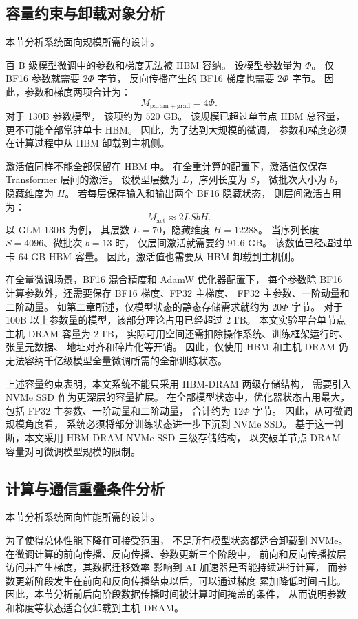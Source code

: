 \documentclass[bachelor,openany,oneside,color,AutoFakeBold=true]{buaathesis}
\begin{document}
\subsection{容量约束与卸载对象分析}

本节分析系统面向规模所需的设计。

百 B 级模型微调中的参数和梯度无法被 HBM 容纳。
设模型参数量为 $\Phi$。
仅 BF16 参数就需要 $2\Phi$ 字节，
反向传播产生的 BF16 梯度也需要 $2\Phi$ 字节。
因此，参数和梯度两项合计为：
\[
M_{\mathrm{param+grad}} = 4\Phi .
\]
对于 130B 参数模型，
该项约为 $520$ GB。
该规模已超过单节点 HBM 总容量，
更不可能全部常驻单卡 HBM。
因此，为了达到大规模的微调，
参数和梯度必须在计算过程中从 HBM 卸载到主机侧。

激活值同样不能全部保留在 HBM 中。
在全重计算的配置下，激活值仅保存
Transformer 层间的激活。
设模型层数为 $L$，序列长度为 $S$，
微批次大小为 $b$，隐藏维度为 $H$。
若每层保存输入和输出两个 BF16 隐藏状态，
则层间激活占用为：
\[
M_{\mathrm{act}} \approx 2LSbH .
\]
以 GLM-130B 为例，
其层数 $L=70$，隐藏维度 $H=12288$。
当序列长度 $S=4096$、微批次 $b=13$ 时，
仅层间激活就需要约 $91.6$ GB。
该数值已经超过单卡 $64$ GB HBM 容量。
因此，激活值也需要从 HBM 卸载到主机侧。

在全量微调场景，BF16 混合精度和 AdamW 优化器配置下，
每个参数除 BF16 计算参数外，还需要保存 BF16 梯度、FP32 主梯度、
FP32 主参数、一阶动量和二阶动量。
如第二章所述，仅模型状态的静态存储需求就约为 $20\Phi$ 字节。
对于 100B 以上参数量的模型，该部分理论占用已经超过 2\,TB。
本文实验平台单节点主机 DRAM 容量为 2\,TB，
实际可用空间还需扣除操作系统、训练框架运行时、张量元数据、
地址对齐和碎片化等开销。
因此，仅使用 HBM 和主机 DRAM
仍无法容纳千亿级模型全量微调所需的全部训练状态。

上述容量约束表明，本文系统不能只采用 HBM-DRAM 两级存储结构，
需要引入 NVMe SSD 作为更深层的容量扩展。
在全部模型状态中，优化器状态占用最大，
包括 FP32 主参数、一阶动量和二阶动量，
合计约为 $12\Phi$ 字节。
因此，从可微调规模角度看，
系统必须将部分训练状态进一步下沉到 NVMe SSD。
基于这一判断，本文采用 HBM-DRAM-NVMe SSD 三级存储结构，
以突破单节点 DRAM 容量对可微调模型规模的限制。

\subsection{计算与通信重叠条件分析}

本节分析系统面向性能所需的设计。

为了使得总体性能下降在可接受范围，
不是所有模型状态都适合卸载到 NVMe。
在微调计算的前向传播、反向传播、参数更新三个阶段中，
前向和反向传播按层访问并产生梯度，其数据迁移效率
影响到 AI 加速器是否能持续进行计算，
而参数更新阶段发生在前向和反向传播结束以后，可以通过梯度
累加降低时间占比。
因此，本节分析前后向阶段数据传播时间被计算时间掩盖的条件，
从而说明参数和梯度等状态适合仅卸载到主机 DRAM。
\end{document}
